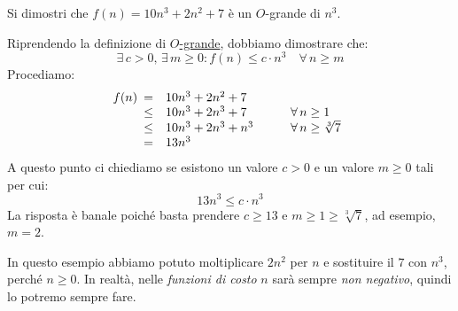 \begin{eg}
    Si dimostri che $f(n)=10n^3+2n^2+7$ è un $O$-grande di
    $n^3$.

    \bigskip\noindent
    Riprendendo la definizione di \hyperref[def:4]{\emph{$O$}-grande}, dobbiamo
    dimostrare che:
    \[\exists\,c>0,\,\exists\,m\geq0:f(n)\leq c\cdot n^3\quad\forall\,n\geq m\]
    Procediamo:
    \[f(n)\begin{array}[t]{cll}
        =   &   10n^3+2n^2+7    & \\
        \leq&   10n^3+2n^3+7    & \qquad\forall\,n\geq1\\
        \leq&   10n^3+2n^3+n^3  & \qquad\forall\,n\geq\sqrt[3]{7}\\
        =   &   13n^3
    \end{array}\]
    A questo punto ci chiediamo se esistono un valore $c>0$ e un
    valore $m\geq 0$ tali per cui:
    \[13n^3\leq c\cdot n^3\]
    La risposta è banale poiché basta prendere $c\geq13$ e
    $m\geq1\geq\sqrt[3]{7}$, ad esempio, $m=2$.
\end{eg}
\begin{note}
    In questo esempio abbiamo potuto moltiplicare $2n^2$ per $n$
    e sostituire il $7$ con $n^3$, perché $n\geq0$. In realtà, nelle
    \emph{funzioni di costo} $n$ sarà sempre \emph{non negativo}, quindi lo
    potremo sempre fare.
\end{note}

